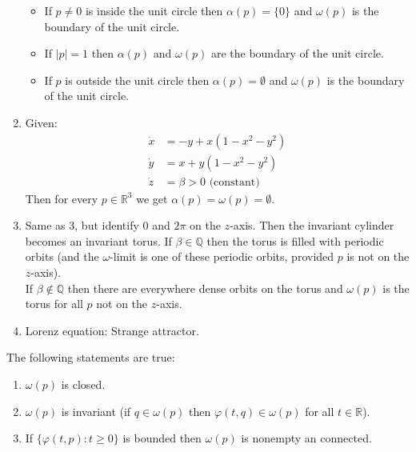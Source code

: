 \documentclass{article}
\newcommand*{\Q}{\mathbb{Q}}
\newcommand*{\R}{\mathbb{R}}
\begin{document}
\begin{exam}
\begin{enumerate}
\begin{itemize}
        \item If $p \neq 0$ is inside the unit circle then $\alpha(p) = \{0\}$ and $\omega(p)$ is the boundary of the unit circle.

        \item If $|p| = 1$ then $\alpha(p)$ and $\omega(p)$ are the boundary of the unit circle.

        \item If $p$ is outside the unit circle then $\alpha(p)=\emptyset$ and $\omega(p)$ is the boundary of the unit circle.
    \end{itemize}



    \item Given:
    $$\begin{aligned}\dot x &= -y+x(1-x^2-y^2)\\
    \dot y &= x+y(1-x^2-y^2)\\
    \dot z &= \beta > 0 \text{ (constant)} \end{aligned}$$
    Then for every $p \in \R^3$ we get $\alpha(p) = \omega(p) = \emptyset$.

    \item Same as 3, but identify $0$ and $2\pi$ on the $z$-axis. Then the invariant cylinder becomes an invariant torus. If $\beta\in\Q$ then the torus is filled with periodic orbits (and the $\omega$-limit is one of these periodic orbits, provided $p$ is not on the $z$-axis).\\
    If $\beta \notin \Q$ then there are everywhere dense orbits on the torus and $\omega(p)$ is the torus for all $p$ not on the $z$-axis.

    \item Lorenz equation: Strange attractor.
\end{enumerate}
\end{exam}

\begin{thm}
    The following statements are true:
    \begin{enumerate}
        \item $\omega(p)$ is closed.

        \item $\omega(p)$ is invariant (if $q \in \omega(p)$ then $\varphi(t,q) \in \omega(p)$ for all $t \in \mathbb{R}$).

        \item If $\{\varphi(t,p):t\geq 0\}$ is bounded then $\omega(p)$ is nonempty an connected.
    \end{enumerate}
\end{thm}
\end{document}
